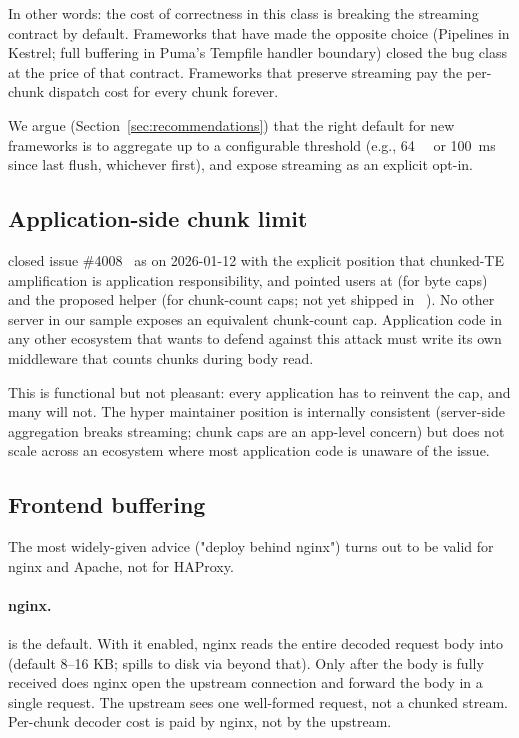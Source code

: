 In other words: the cost of correctness in this class is breaking
the streaming contract by default. Frameworks that have made the
opposite choice (Pipelines in Kestrel; full buffering in Puma's
Tempfile handler boundary) closed the bug class at the price of
that contract. Frameworks that preserve streaming pay the
per-chunk dispatch cost for every chunk forever.

We argue (Section~\ref{sec:recommendations}) that the right
default for new frameworks is to aggregate up to a configurable
threshold (e.g., \SI{64}{\kibi\byte} or
\SI{100}{\milli\second} since last flush, whichever first), and
expose streaming as an explicit opt-in.

\subsection{Application-side chunk limit}
\label{sec:mit-app}

 closed issue \#4008~\cite{hyper_4008} as
 on 2026-01-12 with the explicit position that
chunked-TE amplification is application responsibility, and pointed
users at  (for byte caps) and the
proposed  helper (for chunk-count
caps; not yet shipped in
~\cite{hyper_4008}). No other server in
our sample exposes an equivalent chunk-count cap. Application code
in any other ecosystem that wants to defend against this attack
must write its own middleware that counts chunks during body
read.

This is functional but not pleasant: every application has to
reinvent the cap, and many will not. The hyper maintainer position
is internally consistent (server-side aggregation breaks
streaming; chunk caps are an app-level concern) but does not scale
across an ecosystem where most application code is unaware of the
issue.

\subsection{Frontend buffering}
\label{sec:mit-frontend}

The most widely-given advice ("deploy behind nginx") turns out to
be valid for nginx and Apache, not for HAProxy.

\paragraph{nginx.}
 is the default. With it
enabled, nginx reads the entire decoded request body into
 (default 8--16 KB; spills to
disk via  beyond that). Only
after the body is fully received does nginx open the upstream
connection and forward the body in a single 
request. The upstream sees one well-formed request, not a chunked
stream. Per-chunk decoder cost is paid by nginx, not by the
upstream.


